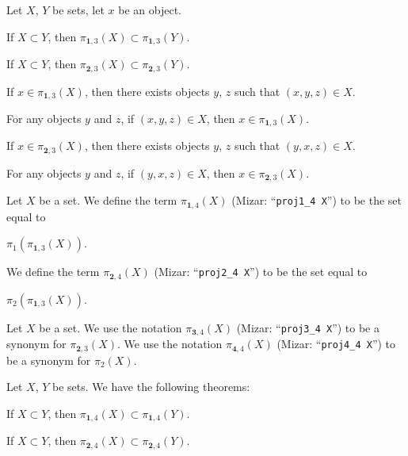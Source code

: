Let $X$, $Y$ be sets, let $x$ be an object.
\begin{thm}
\item\label{xtuple0:10} If $X\subset Y$, then $\pi_{\mathbf{1},3}(X)\subset\pi_{\mathbf{1},3}(Y)$.
\item\label{xtuple0:11} If $X\subset Y$, then $\pi_{\mathbf{2},3}(X)\subset\pi_{\mathbf{2},3}(Y)$.
\item\label{xtuple0:12} If $x\in\pi_{\mathbf{1},3}(X)$, then there
  exists objects $y$, $z$ such that $(x,y,z)\in X$.
\item\label{xtuple0:13} For any objects $y$ and $z$, if $(x,y,z)\in X$,
  then $x\in\pi_{\mathbf{1},3}(X)$.
\item\label{xtuple0:14} If $x\in\pi_{\mathbf{2},3}(X)$, then there
  exists objects $y$, $z$ such that $(y,x,z)\in X$.
\item\label{xtuple0:15} For any objects $y$ and $z$, if $(y,x,z)\in X$,
  then $x\in\pi_{\mathbf{2},3}(X)$.
\end{thm}

\begin{definition}
Let $X$ be a set.
We define the term $\pi_{\mathbf{1},4}(X)$ (Mizar: ``\verb#proj1_4 X#'')
to be the set equal to
\begin{defn}
\item $\pi_{1}(\pi_{\mathbf{1},3}(X))$.
\end{defn}
We define the term $\pi_{\mathbf{2},4}(X)$ (Mizar: ``\verb#proj2_4 X#'')
to be the set equal to
\begin{defn}
\item $\pi_{2}(\pi_{\mathbf{1},3}(X))$.
\end{defn}
\end{definition}

\begin{notation}
Let $X$ be a set. We use the notation $\pi_{\mathbf{3},4}(X)$ (Mizar: ``\verb#proj3_4 X#'') to be a
synonym for $\pi_{\mathbf{2},3}(X)$.
We use the notation $\pi_{\mathbf{4},4}(X)$ (Mizar: ``\verb#proj4_4 X#'') to be a
synonym for $\pi_{2}(X)$.
\end{notation}

Let $X$, $Y$ be sets. We have the following theorems:
\begin{thm}
\item\label{xtuple0:16} If $X\subset Y$, then $\pi_{\mathbf{1},4}(X)\subset\pi_{\mathbf{1},4}(Y)$.
\item\label{xtuple0:17} If $X\subset Y$, then $\pi_{\mathbf{2},4}(X)\subset\pi_{\mathbf{2},4}(Y)$.
\end{thm}